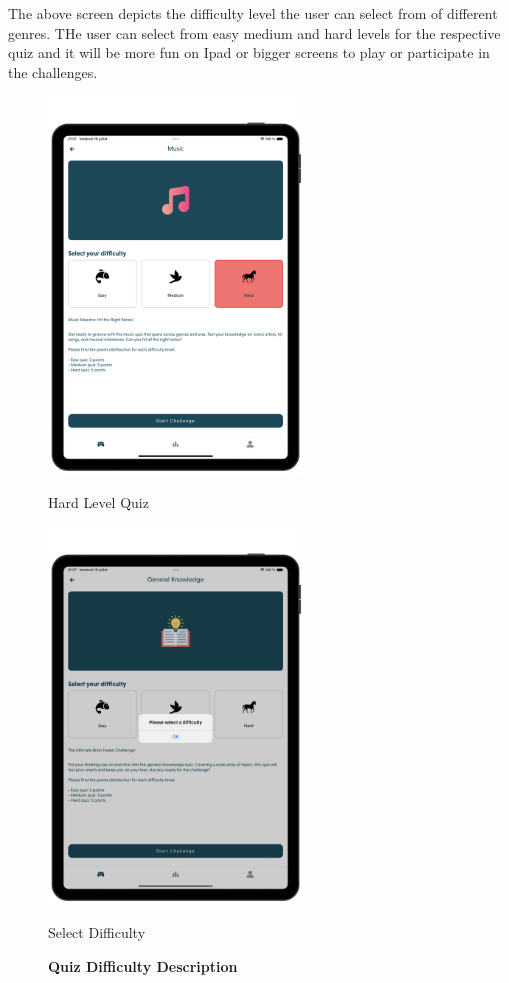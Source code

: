 The above screen depicts the difficulty level the user can select from of different genres. THe user can select from easy medium and hard levels for the respective quiz and it will be more fun on Ipad or bigger screens to play or participate in the challenges.

\begin{figure}[H]
    \centering
    \begin{minipage}[b]{0.43\linewidth}
        \centering
        \includegraphics[height=10cm]{TabletUI/Hard Level Quiz.png}
        \caption{Hard Level Quiz}
    \end{minipage}
    \hspace{0.1\linewidth}
    \begin{minipage}[b]{0.43\linewidth}
        \centering
        \includegraphics[height=10cm]{TabletUI/Select Difficulty.png}
        \caption{Select Difficulty}
    \end{minipage}
    \vspace{0.5cm}
    \caption{\textbf{Quiz Difficulty Description}}
\end{figure}

